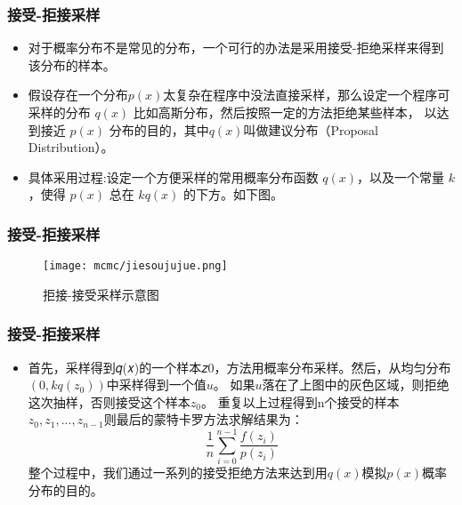 \begin{frame}
  \frametitle{接受-拒接采样}
  \begin{itemize}
    \item 对于概率分布不是常见的分布，一个可行的办法是采用接受-拒绝采样来得到该分布的样本。
    \item 假设存在一个分布$p(x)$太复杂在程序中没法直接采样，那么设定一个程序可采样的分布 $q(x)$ 比如高斯分布，然后按照一定的方法拒绝某些样本，
          以达到接近 $p(x)$ 分布的目的，其中$q(x)$叫做建议分布（Proposal Distribution）。
    \item 具体采用过程:设定一个方便采样的常用概率分布函数 $q(x)$，以及一个常量 $k$，使得 $p(x)$ 总在 $kq(x)$ 的下方。如下图。

  \end{itemize}

\end{frame}

\begin{frame}
  \frametitle{接受-拒接采样}
  \centering
  \begin{figure}
    
    \texttt{[image: mcmc/jiesoujujue.png]}
    \caption{拒接-接受采样示意图}
  \end{figure}
  
\end{frame}

\begin{frame}
  \frametitle{接受-拒接采样}
  \begin{itemize}
    \item  首先，采样得到𝑞(𝑥)的一个样本𝑧0，方法用概率分布采样。然后，从均匀分布$(0, kq(z_0))$中采样得到一个值$𝑢$。
           如果$u$落在了上图中的灰色区域，则拒绝这次抽样，否则接受这个样本$z_0$。
           重复以上过程得到n个接受的样本$z_0, z_1, ..., z_{n-1}$则最后的蒙特卡罗方法求解结果为：$$\frac{1}{n}\sum_{i=0}^{n-1} \frac{f(z_i)}{p(z_i)}$$
           整个过程中，我们通过一系列的接受拒绝方法来达到用$q(x)$模拟$p(x)$概率分布的目的。
  \end{itemize}
\end{frame}

